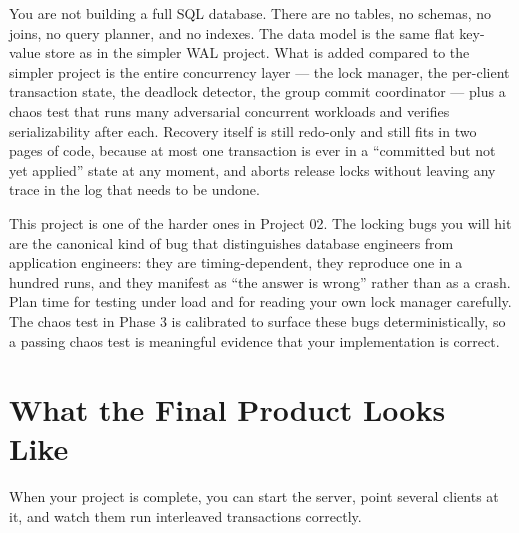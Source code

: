\documentclass[11pt,a4paper]{article}
\begin{document}
You are not building a full SQL database. There are no tables, no schemas, no joins, no query planner, and no indexes. The data model is the same flat key-value store as in the simpler WAL project. What is added compared to the simpler project is the entire concurrency layer --- the lock manager, the per-client transaction state, the deadlock detector, the group commit coordinator --- plus a chaos test that runs many adversarial concurrent workloads and verifies serializability after each. Recovery itself is still redo-only and still fits in two pages of code, because at most one transaction is ever in a ``committed but not yet applied'' state at any moment, and aborts release locks without leaving any trace in the log that needs to be undone.

This project is one of the harder ones in Project 02. The locking bugs you will hit are the canonical kind of bug that distinguishes database engineers from application engineers: they are timing-dependent, they reproduce one in a hundred runs, and they manifest as ``the answer is wrong'' rather than as a crash. Plan time for testing under load and for reading your own lock manager carefully. The chaos test in Phase 3 is calibrated to surface these bugs deterministically, so a passing chaos test is meaningful evidence that your implementation is correct.

\section{What the Final Product Looks Like}

When your project is complete, you can start the server, point several clients at it, and watch them run interleaved transactions correctly.
\end{document}

